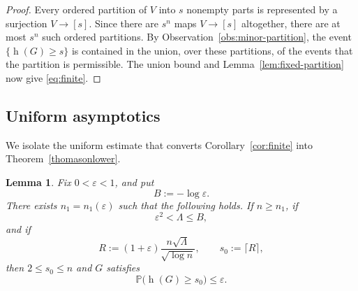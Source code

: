 \documentclass{article}
\newtheorem{lem}[thm]{Lemma}
\newcommand{\eps}{\varepsilon}
\newcommand{\Prob}{\mathbb{P}}
\DeclareMathOperator{\had}{h}
\begin{document}
\begin{proof}
Every ordered partition of \(V\) into \(s\) nonempty parts is represented
by a surjection \(V\to[s]\).  Since there are \(s^n\) maps
\(V\to[s]\) altogether, there are at most \(s^n\) such ordered
partitions.  By Observation~\ref{obs:minor-partition}, the event
\(\{\had(G)\geq s\}\) is contained in the union, over these partitions,
of the events that the partition is permissible.  The union bound and
Lemma~\ref{lem:fixed-partition} now give \eqref{eq:finite}.
\end{proof}

\subsection{Uniform asymptotics}

We isolate the uniform estimate that converts
Corollary~\ref{cor:finite} into Theorem~\ref{thomasonlower}.

\begin{lem}\label{lem:uniform-decay}
Fix \(0<\eps<1\), and put
\[
 B:=-\log\eps.
\]
There exists \(n_1=n_1(\eps)\) such that the following holds.  If
\(n\geq n_1\), if
\begin{equation}\label{eq:Lambda-range}
 \eps^2<\Lambda\leq B,
\end{equation}
and if
\begin{equation}\label{eq:def-R-s}
 R:=(1+\eps)\frac{n\sqrt{\Lambda}}{\sqrt{\log n}},
 \qquad s_0:=\lceil R\rceil,
\end{equation}
then \(2\leq s_0\leq n\) and $G$ satisfies
\begin{equation}\label{eq:uniform-tail}
 \Prob\bigl(\had(G)\geq s_0\bigr)\leq\eps.
\end{equation}
\end{lem}
\end{document}

